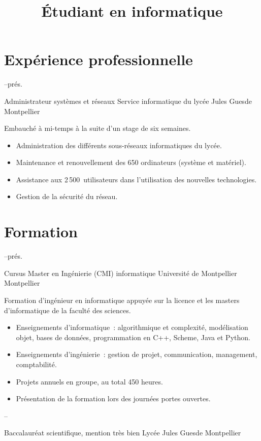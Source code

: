 \documentclass[sans]{moderncv}
\title{Étudiant en informatique}
\newcommand{\fillmid}{\hfill--\hfill}
\newcommand{\stackdate}[2]%
    {\parbox[t]{9mm}{\centering{#1\par\vspace{-1mm} \small{#2}}}}
\begin{document}
\makecvtitle

\section{Expérience professionnelle}

\cventry%
{\stackdate{2016}{mai}\fillmid{}prés.}%
{Administrateur systèmes et réseaux}%
{\newline{}Service informatique du lycée Jules Guesde}%
{Montpellier}{}%
{Embauché à mi-temps à la suite d’un stage de six semaines.
\begin{itemize}
    \item Administration des différents sous-réseaux informatiques du lycée.
    \item Maintenance et renouvellement des 650 ordinateurs (système et matériel).
    \item Assistance aux 2\,500~utilisateurs dans l'utilisation des nouvelles technologies.
    \item Gestion de la sécurité du réseau.
\end{itemize}}

\section{Formation}

\cventry%
{\stackdate{2015}{sept.}\fillmid{}prés.}%
{Cursus Master en Ingénierie (CMI) informatique}%
{\newline{}Université de Montpellier}%
{Montpellier}{}%
{Formation d’ingénieur en informatique appuyée sur la licence et les masters d’informatique de la faculté des sciences.
\begin{itemize}
    \item Enseignements d’informatique~: algorithmique et complexité, modélisation objet, bases de données, programmation en C++, Scheme, Java et Python.
    \item Enseignements d’ingénierie~: gestion de projet, communication, management, comptabilité.
    \item Projets annuels en groupe, au total 450 heures.
    \item Présentation de la formation lors des journées portes ouvertes.
\end{itemize}}

\cventry%
{\stackdate{2012}{sept.}\fillmid\stackdate{2015}{juillet}}%
{Baccalauréat scientifique, mention très bien}%
{\newline{}Lycée Jules Guesde}%
{Montpellier}{}{}
\end{document}
